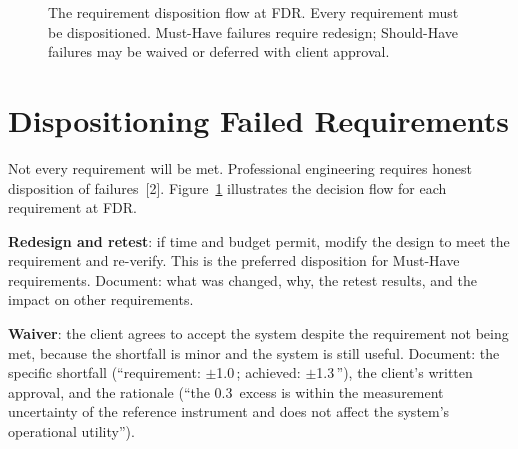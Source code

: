 \begin{figure}[htbp]
\centering
{}
\caption{The requirement disposition flow at FDR. Every requirement must be dispositioned. Must-Have failures require redesign; Should-Have failures may be waived or deferred with client approval.}\label{fig:disposition-flow}
\end{figure}


\section{Dispositioning Failed Requirements}
Not every requirement will be met. Professional engineering requires honest disposition of failures~[2]. Figure~\ref{fig:disposition-flow} illustrates the decision flow for each requirement at FDR.

\textbf{Redesign and retest}: if time and budget permit, modify the design to meet the requirement and re-verify. This is the preferred disposition for Must-Have requirements. Document: what was changed, why, the retest results, and the impact on other requirements.

\textbf{Waiver}: the client agrees to accept the system despite the requirement not being met, because the shortfall is minor and the system is still useful. Document: the specific shortfall (``requirement: $\pm$1.0\,\degC{}; achieved: $\pm$1.3\,\degC{}''), the client's written approval, and the rationale (``the 0.3\,\degC{} excess is within the measurement uncertainty of the reference instrument and does not affect the system's operational utility'').

